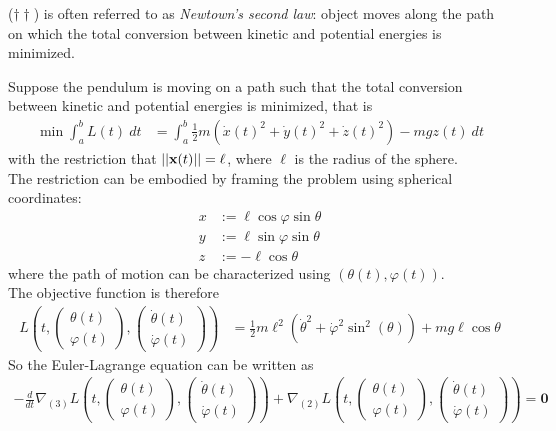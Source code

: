 \documentclass{article}
\begin{document}
	\begin{remark}
		($\dagger \dagger$) is often referred to as \emph{Newtown's second law}: object moves along the path on which the total conversion between kinetic and potential energies is minimized.
	\end{remark}
	
	\begin{example}
		Suppose the pendulum is moving on a path such that the total conversion between kinetic and potential energies is minimized, that is
		\begin{align}
			\min \int_a^b L(t)\ dt &= \int_a^b \frac{1}{2} m (\dot{x}(t)^2 + \dot{y}(t)^2 + \dot{z}(t)^2) - m g z(t)\ dt
		\end{align}
		with the restriction that $\vert \vert {\textbf{x}(t)} \vert \vert = \ell$, where $\ell$ is the radius of the sphere. \\
		The restriction can be embodied by framing the problem using spherical coordinates:
		\begin{align}
			x &:= \ell \cos \varphi \sin \theta \\
			y &:= \ell \sin \varphi \sin \theta \\
			z &:= - \ell \cos \theta
		\end{align}
		where the path of motion can be characterized using $(\theta(t), \varphi(t))$. \\
		The objective function is therefore
		\begin{align}
			L\left( t, \begin{pmatrix} \theta(t) \\ \varphi(t)	\end{pmatrix}, \begin{pmatrix} \dot{\theta}(t) \\ \dot{\varphi}(t) \end{pmatrix} \right) &= \frac{1}{2} m \ell^2 (\dot{\theta}^2 + \dot{\varphi}^2 \sin^2 (\theta)) + mg\ell \cos \theta
		\end{align}
		So the Euler-Lagrange equation can be written as
		\begin{align}
			- \frac{d}{dt} \nabla_{(3)} L \left( t, \begin{pmatrix} \theta(t) \\ \varphi(t)	\end{pmatrix}, \begin{pmatrix} \dot{\theta}(t) \\ \dot{\varphi}(t) \end{pmatrix} \right)
			+ \nabla_{(2)} L\left( t, \begin{pmatrix} \theta(t) \\ \varphi(t)	\end{pmatrix}, \begin{pmatrix} \dot{\theta}(t) \\ \dot{\varphi}(t) \end{pmatrix} \right)
			= \textbf{0}
		\end{align}
	\end{example}
	
\end{document}
